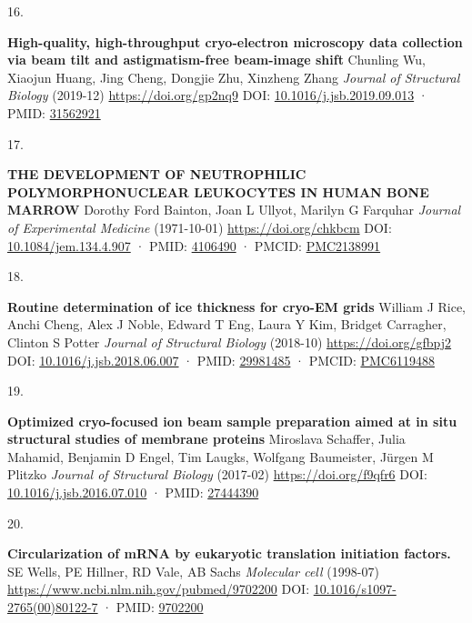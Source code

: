 \documentclass[
]{article}
\newlength{\cslhangindent}
\newlength{\csllabelwidth}
\newlength{\cslentryspacingunit} %
\newenvironment{CSLReferences}[2] %
 {%
  \setlength{\parindent}{0pt}
  \ifodd #1
  \let\oldpar\par
  \def\par{\hangindent=\cslhangindent\oldpar}
  \fi
  \setlength{\parskip}{#2\cslentryspacingunit}
 }%
 {}
\newcommand{\CSLBlock}[1]{#1\hfill\break}
\newcommand{\CSLLeftMargin}[1]{\parbox[t]{\csllabelwidth}{#1}}
\newcommand{\CSLRightInline}[1]{\parbox[t]{\linewidth - \csllabelwidth}{#1}\break}
\begin{document}
\begin{CSLReferences}{0}{0}
\leavevmode{}%
\CSLLeftMargin{16. }%
\CSLRightInline{\textbf{High-quality, high-throughput cryo-electron microscopy data collection via beam tilt and astigmatism-free beam-image shift}
\CSLBlock{Chunling Wu, Xiaojun Huang, Jing Cheng, Dongjie Zhu, Xinzheng Zhang} \emph{Journal of Structural Biology} (2019-12) \url{https://doi.org/gp2nq9}
\CSLBlock{DOI: \href{https://doi.org/10.1016/j.jsb.2019.09.013}{10.1016/j.jsb.2019.09.013} · PMID: \href{https://www.ncbi.nlm.nih.gov/pubmed/31562921}{31562921}}}

\leavevmode{}%
\CSLLeftMargin{17. }%
\CSLRightInline{\textbf{THE DEVELOPMENT OF NEUTROPHILIC POLYMORPHONUCLEAR LEUKOCYTES IN HUMAN BONE MARROW}
\CSLBlock{Dorothy Ford Bainton, Joan L Ullyot, Marilyn G Farquhar} \emph{Journal of Experimental Medicine} (1971-10-01) \url{https://doi.org/chkbcm}
\CSLBlock{DOI: \href{https://doi.org/10.1084/jem.134.4.907}{10.1084/jem.134.4.907} · PMID: \href{https://www.ncbi.nlm.nih.gov/pubmed/4106490}{4106490} · PMCID: \href{https://www.ncbi.nlm.nih.gov/pmc/articles/PMC2138991}{PMC2138991}}}

\leavevmode{}%
\CSLLeftMargin{18. }%
\CSLRightInline{\textbf{Routine determination of ice thickness for cryo-EM grids}
\CSLBlock{William J Rice, Anchi Cheng, Alex J Noble, Edward T Eng, Laura Y Kim, Bridget Carragher, Clinton S Potter} \emph{Journal of Structural Biology} (2018-10) \url{https://doi.org/gfbpj2}
\CSLBlock{DOI: \href{https://doi.org/10.1016/j.jsb.2018.06.007}{10.1016/j.jsb.2018.06.007} · PMID: \href{https://www.ncbi.nlm.nih.gov/pubmed/29981485}{29981485} · PMCID: \href{https://www.ncbi.nlm.nih.gov/pmc/articles/PMC6119488}{PMC6119488}}}

\leavevmode{}%
\CSLLeftMargin{19. }%
\CSLRightInline{\textbf{Optimized cryo-focused ion beam sample preparation aimed at in situ structural studies of membrane proteins}
\CSLBlock{Miroslava Schaffer, Julia Mahamid, Benjamin D Engel, Tim Laugks, Wolfgang Baumeister, Jürgen M Plitzko} \emph{Journal of Structural Biology} (2017-02) \url{https://doi.org/f9qfr6}
\CSLBlock{DOI: \href{https://doi.org/10.1016/j.jsb.2016.07.010}{10.1016/j.jsb.2016.07.010} · PMID: \href{https://www.ncbi.nlm.nih.gov/pubmed/27444390}{27444390}}}

\leavevmode{}%
\CSLLeftMargin{20. }%
\CSLRightInline{\textbf{Circularization of mRNA by eukaryotic translation initiation factors.}
\CSLBlock{SE Wells, PE Hillner, RD Vale, AB Sachs} \emph{Molecular cell} (1998-07) \url{https://www.ncbi.nlm.nih.gov/pubmed/9702200}
\CSLBlock{DOI: \href{https://doi.org/10.1016/s1097-2765(00)80122-7}{10.1016/s1097-2765(00)80122-7} · PMID: \href{https://www.ncbi.nlm.nih.gov/pubmed/9702200}{9702200}}}


\end{CSLReferences}
\end{document}
